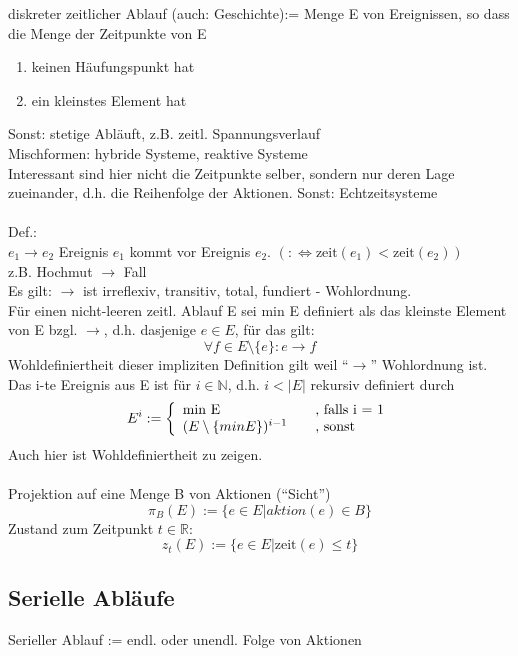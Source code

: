 \documentclass[a4paper,12pt]{scrartcl}
\begin{document}
 diskreter zeitlicher Ablauf (auch: Geschichte):= Menge E von Ereignissen, so dass die Menge der Zeitpunkte von E
 \begin{enumerate}
  \item keinen Häufungspunkt hat
  \item ein kleinstes Element hat
 \end{enumerate}
Sonst: stetige Abläuft, z.B. zeitl. Spannungsverlauf\\
Mischformen: hybride Systeme, reaktive Systeme\\
Interessant sind hier nicht die Zeitpunkte selber, sondern nur deren Lage zueinander, d.h. die Reihenfolge der Aktionen. Sonst: Echtzeitsysteme\\
\\
Def.:\\
$e_1\rightarrow e_2$ Ereignis $e_1$ kommt vor Ereignis $e_2$. $(:\Leftrightarrow \text{zeit}(e_1)<\text{zeit}(e_2))$\\
z.B. Hochmut $\rightarrow$ Fall\\
Es gilt: $\rightarrow$ ist irreflexiv, transitiv, total, fundiert - Wohlordnung.\\
Für einen nicht-leeren zeitl. Ablauf E sei min E definiert als das kleinste Element von E bzgl. $\rightarrow$, d.h. dasjenige $e\in E$, für das gilt:
$$\forall f \in E \setminus \{e\}: e\rightarrow f$$
Wohldefiniertheit dieser impliziten Definition gilt weil "`$\rightarrow$"' Wohlordnung ist.\\
Das i-te Ereignis aus E ist für $i\in \mathbb{N}$, d.h. $i<|E|$ rekursiv definiert durch
$$E^i := \left\{ 
  \begin{array}{l l}
    \text{min E} & \quad \text{, falls i = 1}\\
    (E\setminus\{min E\})^{i-1} & \quad \text{, sonst}
  \end{array} \right. $$
Auch hier ist Wohldefiniertheit zu zeigen.\\
\\
Projektion auf eine Menge B von Aktionen ("`Sicht"')
$$\pi_B(E):=\{e\in E|aktion(e)\in B\}$$
Zustand zum Zeitpunkt $t\in \mathbb{R}$:
$$z_t(E):=\{e\in E|\text{zeit}(e)\leq t\}$$

\subsection{Serielle Abläufe}

Serieller Ablauf := endl. oder unendl. Folge von Aktionen\\
\end{document}
